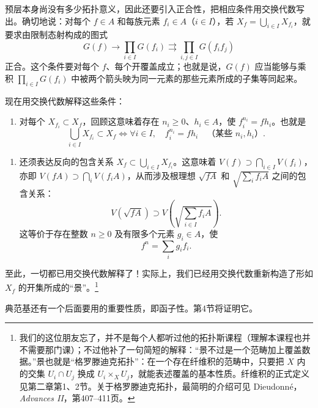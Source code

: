 预层本身尚没有多少拓扑意义，因此还要引入正合性，把相应条件用交换代数写出。确切地说：对每个 $f\in A$ 和每族元素 $f_i\in A$（$i\in I$），若 $X_f=\bigcup_{i\in I}X_{f_i}$，就要求由限制态射构成的图式
\begin{equation}\tag{3.15}
G(f)\longrightarrow\prod_{i\in I}G(f_i)
\rightrightarrows\prod_{i,j\in I}G(f_if_j)
\end{equation}
正合。这个条件要对每个 $f$、每个开覆盖成立；也就是说，$G(f)$ 应当能够与乘积 $\prod_{i\in I}G(f_i)$ 中被两个箭头映为同一元素的那些元素所成的子集等同起来。

现在用交换代数解释这些条件：
\begin{enumerate}[label=\alph*)]
\item 对每个 $X_{f_i}\subset X_f$，回顾这意味着存在 $n_i\geq0$、$h_i\in A$，使 $f_i^{n_i}=fh_i$。也就是
\[
\bigcup_{i\in I}X_{f_i}\subset X_f
\iff
\forall i\in I,\quad f_i^{n_i}=fh_i
\quad\text{（某些 $n_i,h_i$）}.
\]
\end{enumerate}

\begin{enumerate}[label=\alph*),start=2]
\item 还须表达反向的包含关系 $X_f\subset\bigcup_{i\in I}X_{f_i}$。这意味着 $V(f)\supset\bigcap_{i\in I}V(f_i)$，亦即 $V(fA)\supset\bigcap_iV(f_iA)$，从而涉及根理想 $\sqrt{fA}$ 和 $\sqrt{\sum_i f_iA}$ 之间的包含关系：
\begin{equation}\tag{3.16}
V(\sqrt{fA})\supset V\left(\sqrt{\sum_{i\in I}f_iA}\right).
\end{equation}
这等价于存在整数 $n\geq0$ 及有限多个元素 $g_i\in A$，使
\begin{equation}\tag{3.17}
f^n=\sum_i g_if_i.
\end{equation}
\end{enumerate}
至此，一切都已用交换代数解释了！实际上，我们已经用交换代数重新构造了形如 $X_f$ 的开集所成的“景”。\footnote{我们的这位朋友忘了，并不是每个人都听过他的拓扑斯课程（理解本课程也并不需要那门课）；不过他补了一句简短的解释：“景不过是一个范畴加上覆盖数据。”景也就是“格罗滕迪克拓扑”：在一个存在纤维积的范畴中，只要把 $X$ 内的交集 $U_i\cap U_j$ 换成 $U_i\times_XU_j$，就能表述覆盖的基本性质。纤维积的正式定义见第二章第1、2节。关于格罗滕迪克拓扑，最简明的介绍可见 Dieudonn\'e，\textit{Advances II}，第407--411页。}

典范基还有一个后面要用的重要性质，即函子性。第4节将证明它。

